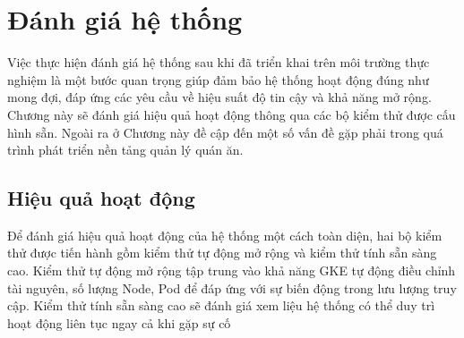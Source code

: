 \chapter{Đánh giá hệ thống}\label{chap4}
Việc thực hiện đánh giá hệ thống sau khi đã triển khai trên môi trường thực nghiệm là một bước quan trọng giúp đảm bảo hệ thống hoạt động đúng như mong đợi, đáp ứng các yêu cầu về hiệu suất độ tin cậy và khả năng mở rộng.
Chương này sẽ đánh giá hiệu quả hoạt động thông qua các bộ kiểm thử được cấu hình sẵn.
Ngoài ra ở Chương này đề cập đến một số vấn đề gặp phải trong quá trình phát triển nền tảng quản lý quán ăn.
\section{Hiệu quả hoạt động}\label{sec:efficiency}
Để đánh giá hiệu quả hoạt động của hệ thống một cách toàn diện, hai bộ kiểm thử được tiến hành gồm kiểm thử tự động mở rộng và kiểm thử tính sẵn sàng cao.
Kiểm thử tự động mở rộng tập trung vào khả năng GKE tự động điều chỉnh tài nguyên, số lượng Node, Pod để đáp ứng với sự biến động trong lưu lượng truy cập.
Kiểm thử tính sẵn sàng cao sẽ đánh giá xem liệu hệ thống có thể duy trì hoạt động liên tục ngay cả khi gặp sự cố
